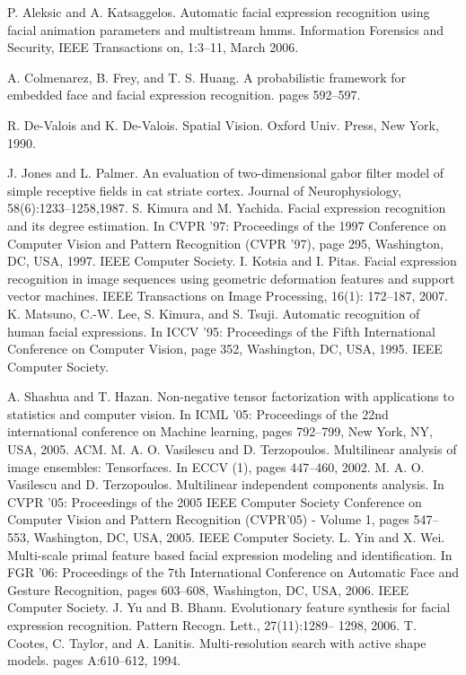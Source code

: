 \documentclass[12pt, twoside]{report}
\begin{document}
	\begin{thebibliography}{9}
			P. Aleksic and A. Katsaggelos. Automatic facial expression 				recognition using facial animation parameters and multistream 			hmms. Information Forensics and Security, IEEE Transactions 			on, 1:3–11, March 2006.
			
			A. Colmenarez, B. Frey, and T. S. Huang. A probabilistic 				framework for embedded face and facial expression recognition. 		pages 592–597.
	
			R. De-Valois and K. De-Valois. Spatial Vision. Oxford Univ. 			Press, New York, 1990.
	
			J. Jones and L. Palmer. An evaluation of two-dimensional gabor 		filter model of simple receptive fields in cat striate cortex. 		Journal of Neurophysiology, 58(6):1233–1258,1987.
			S. Kimura and M. Yachida. Facial expression recognition and 			its degree estimation. In CVPR ’97: Proceedings of the 1997 			Conference on Computer Vision and Pattern Recognition (CVPR 			’97), page 295, Washington, DC, USA, 1997. IEEE Computer 				Society.	
			I. Kotsia and I. Pitas. Facial expression recognition in image 		sequences using geometric deformation features and support 				vector machines. IEEE Transactions on Image Processing, 16(1):			172–187, 2007.
			K. Matsuno, C.-W. Lee, S. Kimura, and S. Tsuji. Automatic 				recognition of human facial expressions. In ICCV ’95: 					Proceedings of the Fifth International Conference on Computer 			Vision, page 352, Washington, DC, USA, 1995. IEEE Computer 				Society.		
		
			A. Shashua and T. Hazan. Non-negative tensor factorization 				with applications to statistics and computer vision. In ICML 			’05: Proceedings of the 22nd international conference on 				Machine learning, pages 792–799, New York, NY, USA, 2005. ACM.	
			M. A. O. Vasilescu and D. Terzopoulos. Multilinear analysis of 		image ensembles: Tensorfaces. In ECCV (1), pages 447–460, 				2002.
			M. A. O. Vasilescu and D. Terzopoulos. Multilinear independent 		components analysis. In CVPR ’05: Proceedings of the 2005 IEEE 		Computer Society Conference on Computer Vision and Pattern 				Recognition (CVPR’05) - Volume 1, pages 547–553, Washington, 			DC, USA, 2005. IEEE Computer Society.
			L. Yin and X. Wei. Multi-scale primal feature based facial 			expression modeling and identification. In FGR ’06: 					Proceedings of the 7th International Conference on Automatic 			Face and Gesture Recognition, pages 603–608, Washington, DC, 			USA, 2006. IEEE Computer Society.
		J. Yu and B. Bhanu. Evolutionary feature synthesis for facial 			expression recognition. Pattern Recogn. Lett., 27(11):1289–				1298, 2006.
		T. Cootes, C. Taylor, and A. Lanitis. Multi-resolution search with active shape models. pages A:610–612, 1994. 
		

\end{thebibliography}
\end{document}
